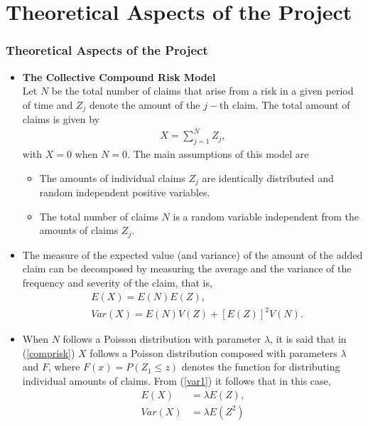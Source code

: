 \documentclass[10pt]{beamer} %
\begin{document}
\section{Theoretical Aspects of the Project}
\begin{frame}
\frametitle[9pt]{Theoretical Aspects of the Project}

\begin{itemize}
    \item \textbf{The Collective Compound Risk Model}\\
    Let $N$ be the total number of claims that arise from a risk in a given period of time and $Z_j$ denote the amount of the $j-$th claim. The total amount of claims is given by
\begin{align}
X=\sum_{j=1}^{N}Z_j,\label{comprisk}
\end{align}
with $X=0$ when $N=0$. The main assumptions of this model are
\begin{itemize}
	\item  The amounts of individual claims $Z_j$ are identically distributed and random independent positive variables.
	\item The total number of claims $N$ is a random variable independent from the amounts of claims $Z_j$.
\end{itemize}
\end{itemize}
\end{frame}
\begin{frame}
\begin{itemize}
 \item The measure of the expected value (and variance) of the amount of the added claim can be decomposed by measuring the average and the variance of the frequency and severity of the claim, that is,
\begin{align}
&E(X)=E(N)E(Z),\\
&Var(X)=E(N)V(Z)+[E(Z)]^2V(N).\label{var1}
\end{align}
\item \noindent When $N$ follows a Poisson distribution with parameter $\lambda$, it is said that in (\ref{comprisk}) $X$ follows a Poisson distribution composed with parameters $\lambda$ and $F$, where $F(x)=P(Z_1\leq z)$ denotes the function for distributing individual amounts of claims. From (\ref{var1}) it follows that in this case,
\begin{align*}
E(X)&=\lambda E(Z),\\
Var(X)&=\lambda E(Z^2)
\end{align*}

\end{itemize}


    
\end{frame}
\end{document}
